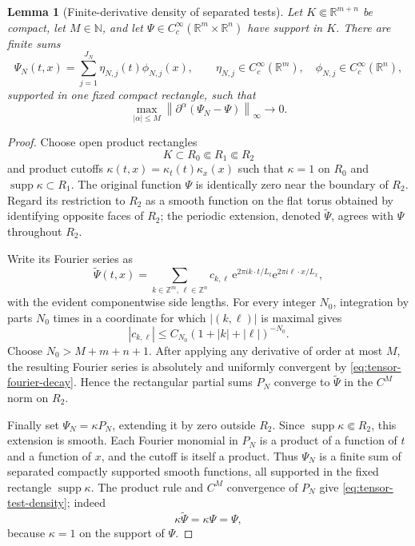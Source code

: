 \documentclass[11pt,oneside]{book}
\newtheorem{lemma}[theorem]{Lemma}
\theoremstyle{definition}
\theoremstyle{remark}
\newcommand{\R}{\mathbb R}
\newcommand{\N}{\mathbb N}
\newcommand{\supp}{\operatorname{supp}}
\newcommand{\1}{\mathbf 1}
\newcommand{\norm}[1]{\left\lVert #1\right\rVert}
\newcommand{\e}{\mathrm e}
\begin{document}
\begin{lemma}[Finite-derivative density of separated tests]
\label{lem:tensor-test-density}
Let $K\Subset\R^{m+n}$ be compact, let $M\in\N$, and let
$\Psi\in C_c^\infty(\R^m\times\R^n)$ have support in $K$.  There are finite
sums
\[
 \Psi_N(t,x)=\sum_{j=1}^{J_N}\eta_{N,j}(t)\phi_{N,j}(x),
 \qquad
 \eta_{N,j}\in C_c^\infty(\R^m),\quad
 \phi_{N,j}\in C_c^\infty(\R^n),
\]
supported in one fixed compact rectangle, such that
\begin{equation}
 \max_{|\alpha|\le M}
 \norm{\partial^\alpha(\Psi_N-\Psi)}_\infty\longrightarrow0.
 \label{eq:tensor-test-density}
\end{equation}
\end{lemma}

\begin{proof}
Choose open product rectangles
\[
 K\subset R_0\Subset R_1\Subset R_2
\]
and product cutoffs
$\kappa(t,x)=\kappa_t(t)\kappa_x(x)$ such that
$\kappa=1$ on $R_0$ and $\supp\kappa\subset R_1$.  The original function
$\Psi$ is identically zero near the boundary of $R_2$.  Regard its
restriction to $R_2$ as a smooth function on the flat torus obtained by
identifying opposite faces of $R_2$; the periodic extension, denoted
$\widetilde\Psi$, agrees with $\Psi$ throughout $R_2$.

Write its Fourier series as
\[
 \widetilde\Psi(t,x)
 =\sum_{k\in\mathbb Z^m,\,\ell\in\mathbb Z^n}
 c_{k,\ell}\,
 \e^{2\pi i k\cdot t/L_t}\e^{2\pi i\ell\cdot x/L_x},
\]
with the evident componentwise side lengths.  For every integer $N_0$,
integration by parts $N_0$ times in a coordinate for which
$|(k,\ell)|$ is maximal gives
\begin{equation}
 |c_{k,\ell}|
 \le C_{N_0}(1+|k|+|\ell|)^{-N_0}.               \label{eq:tensor-fourier-decay}
\end{equation}
Choose $N_0>M+m+n+1$.  After applying any derivative of order at most $M$,
the resulting Fourier series is absolutely and uniformly convergent by
\eqref{eq:tensor-fourier-decay}.  Hence the rectangular partial sums $P_N$
converge to $\widetilde\Psi$ in the $C^M$ norm on $R_2$.

Finally set $\Psi_N=\kappa P_N$, extending it by zero outside $R_2$.  Since
$\supp\kappa\Subset R_2$, this extension is smooth.  Each Fourier monomial
in $P_N$ is a product of a function of $t$ and a function of $x$, and the
cutoff is itself a product.  Thus $\Psi_N$ is a finite sum of separated
compactly supported smooth functions, all supported in the fixed rectangle
$\supp\kappa$.  The product rule and $C^M$ convergence of $P_N$ give
\eqref{eq:tensor-test-density}; indeed
\[
 \kappa\widetilde\Psi=\kappa\Psi=\Psi,
\]
because $\kappa=1$ on the support of $\Psi$.
\end{proof}
\end{document}
